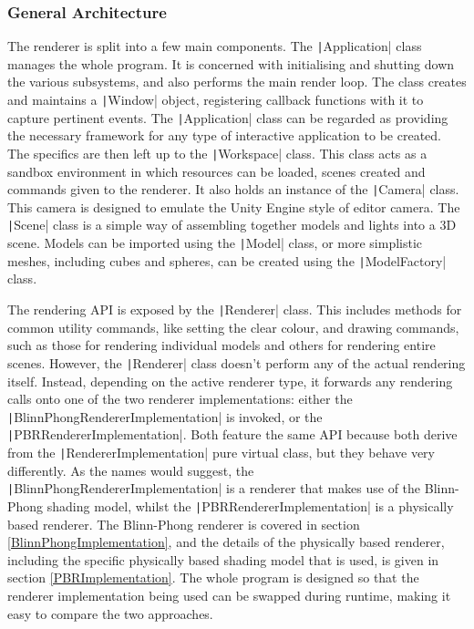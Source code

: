 \subsubsection{General Architecture}

The renderer is split into a few main components. The \texttt|Application| class manages the whole program. It is concerned with initialising and shutting down the various subsystems, and also performs the main render loop. The class creates and maintains a \texttt|Window| object, registering callback functions with it to capture pertinent events. The \texttt|Application| class can be regarded as providing the necessary framework for any type of interactive application to be created. The specifics are then left up to the \texttt|Workspace| class. This class acts as a sandbox environment in which resources can be loaded, scenes created and commands given to the renderer. It also holds an instance of the \texttt|Camera| class. This camera is designed to emulate the Unity Engine style of editor camera. The \texttt|Scene| class is a simple way of assembling together models and lights into a 3D scene. Models can be imported using the \texttt|Model| class, or more simplistic meshes, including cubes and spheres, can be created using the \texttt|ModelFactory| class.

The rendering API is exposed by the \texttt|Renderer| class. This includes methods for common utility commands, like setting the clear colour, and drawing commands, such as those for rendering individual models and others for rendering entire scenes. However, the \texttt|Renderer| class doesn't perform any of the actual rendering itself. Instead, depending on the active renderer type, it forwards any rendering calls onto one of the two renderer implementations: either the \texttt|BlinnPhongRendererImplementation| is invoked, or the \texttt|PBRRendererImplementation|. Both feature the same API because both derive from the \texttt|RendererImplementation| pure virtual class, but they behave very differently. As the names would suggest, the \texttt|BlinnPhongRendererImplementation| is a renderer that makes use of the Blinn-Phong shading model, whilst the \texttt|PBRRendererImplementation| is a physically based renderer. The Blinn-Phong renderer is covered in section \ref{BlinnPhongImplementation}, and the details of the physically based renderer, including the specific physically based shading model that is used, is given in section \ref{PBRImplementation}. The whole program is designed so that the renderer implementation being used can be swapped during runtime, making it easy to compare the two approaches.

